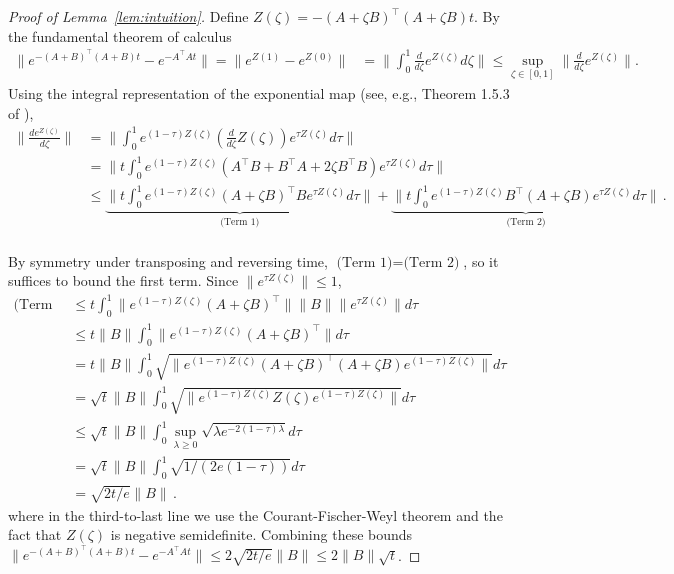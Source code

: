 \documentclass[11pt]{article} %
\newcommand{\<}{\langle}
\renewcommand{\>}{\rangle}
\theoremstyle{plain}
\theoremstyle{definition}
\theoremstyle{remark}
\begin{document}
\begin{proof}[Proof of Lemma~\ref{lem:intuition}]
Define $Z(\zeta) = -(A + \zeta B)^{\top} (A + \zeta B) t$. 
By the fundamental theorem of calculus
\begin{align*}
\|e^{-(A+B)^{\top} (A+B)t} - e^{-A^{\top} A t}\| = \|e^{Z(1)} - e^{Z(0)}\| &= \|\int_{0}^1 \frac{d}{d\zeta}e^{Z(\zeta)}d\zeta\| \leq \sup_{\zeta \in [0,1]} \|\frac{d}{d\zeta} e^{Z(\zeta)}\|.
\end{align*}
Using the integral representation of the exponential map (see, e.g., Theorem 1.5.3 of \citep{dollard_friedman_1984}),
\begin{align*}
\|\frac{d e^{Z(\zeta)}}{d\zeta}\| &= \| \int_{0}^1 e^{(1-\tau)Z(\zeta)} (\frac{d}{d\zeta} Z(\zeta)) e^{\tau Z(\zeta)} d\tau \| \\
&= \|t \int_{0}^1 e^{(1-\tau) Z(\zeta)} (A^{\top} B + B^{\top} A + 2 \zeta B^{\top} B) e^{\tau Z(\zeta)} d\tau\| \\
&\leq \underbrace{\|t \int_{0}^1 e^{(1-\tau) Z(\zeta)} (A+\zeta B)^{\top} B e^{\tau Z(\zeta)} d\tau\|}_{\mbox{(Term 1)}} + \underbrace{\|t \int_{0}^1 e^{(1-\tau) Z(\zeta)} B^{\top} (A+\zeta B) e^{\tau Z(\zeta)} d\tau\|}_{\mbox{(Term 2)}}\,. \\
\end{align*}










By symmetry under transposing and reversing time, $\mbox{(Term 1)}  = \mbox{(Term 2)}$, so it suffices to bound the first term. Since $\|e^{\tau Z(\zeta)} \| \leq 1$,
\begin{align*}\mbox{(Term 1)} &\leq t \int_{0}^1 \|e^{(1-\tau) Z(\zeta)} (A + \zeta B)^{\top}\| \|B\| \|e^{\tau Z(\zeta)}\| d\tau \\
&\leq t \|B\| \int_{0}^1 \|e^{(1-\tau) Z(\zeta)} (A+\zeta B)^{\top}\| d\tau \\
&= t  \|B\|\int_{0}^1 \sqrt{\|e^{(1-\tau) Z(\zeta)} (A + \zeta B)^{\top} (A + \zeta B) e^{(1-\tau) Z(\zeta)}\|} d\tau \\
&= \sqrt{t} \|B\|\int_{0}^1 \sqrt{\|e^{(1-\tau) Z(\zeta)} Z(\zeta) e^{(1-\tau) Z(\zeta)}\|} d\tau \\
&\leq \sqrt{t} \|B\|\int_{0}^1 \sup_{\lambda \geq 0} \sqrt{\lambda e^{-2(1-\tau) \lambda}} d\tau\, \\
&= \sqrt{t} \|B\| \int_{0}^1 \sqrt{1/(2e(1-\tau))} d\tau \\
&= \sqrt{2t/e} \|B\|\,.
\end{align*}
where in the third-to-last line we use the Courant-Fischer-Weyl theorem and the fact that $Z(\zeta)$ is negative semidefinite. Combining these bounds $
\|e^{-(A+B)^{\top} (A+B) t} - e^{-A^{\top} A t}\| \leq 2\sqrt{2t/e} \|B\| \leq 2 \|B\| \sqrt{t}$.
\end{proof}
\end{document}
